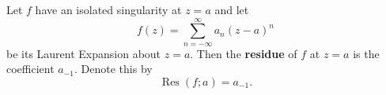 Let $f$ have an isolated singularity at $z = a$ and let
$$f(z) = \sum_{n=-\infty}^{\infty} a_n(z-a)^n$$
be its Laurent Expansion about $z = a$. Then the \textbf{residue} of $f$ at $z = a$ is the coefficient $a_{-1}$. Denote this by
$$\operatorname{Res}(f; a) = a_{-1}.$$
